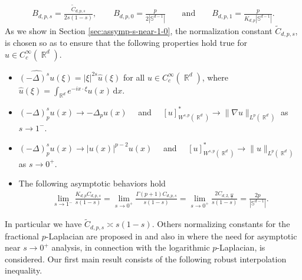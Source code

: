 \documentclass[12pt, reqno]{amsart}%
\theoremstyle{plain}  %
\theoremstyle{definition}  %
\theoremstyle{remark}
\numberwithin{equation}{section}
\DeclareMathOperator{\R}{\mathbb{R}}
\renewcommand{\d}{\,\mathrm{d}}
\begin{document}
\begin{align*}
B_{d,p,s}=  \frac{\widetilde{C}_{d,p,s}}{2s(1-s)}, \qquad B_{d,p,0}=\frac{p}{2|\mathbb{S}^{d-1}|}\qquad\text{and}\qquad B_{d,p,1}=\frac{p}{K_{d,p}|\mathbb{S}^{d-1}|}.
\end{align*}
As we  show in Section \ref{sec:assymp-s-near-1-0}, the normalization constant $\widetilde{C}_{d,p,s}$, is chosen so as to ensure that the following properties hold true for $u\in C_c^\infty(\R^d)$.
\begin{itemize}
\item $\widehat{(-\Delta)^s u}(\xi)= |\xi|^{2s}\widehat{u}(\xi)$  for all $u\in C_c^\infty(\R^d)$, where $ \widehat{u}(\xi) =\int_{\R^d} e^{-ix\cdot \xi} u(x)\d x$.
\item  $(-\Delta)^s_p u(x)\to -\Delta_p u(x)\quad$  and  $\quad[u]^*_{W^{s,p}(\R^d)}\to  \|\nabla u\|_{L^{p}(\R^d)}$ as  $s\to1^-$.
\item $(-\Delta)^s_p u(x)\to |u(x)|^{p-2} u(x)\quad$  and  $\quad[u]^*_{W^{s,p}(\R^d)}\to \|u\|_{L^{p}(\R^d)}$ as  $s\to0^+$.
\item The following asymptotic behaviors hold
\begin{align*}
\lim_{s\to 1^-} \frac{K_{d,p}C_{d,p,s}}{s(1-s)}=\lim_{s\to 0^+}\frac{\Gamma(p+1)C_{d,p,s}}{s(1-s)}=\lim_{s\to 0^+} \frac{2C_{d,2, \frac{sp}{2}}}{s(1-s)}=\frac{2p}{|\mathbb{S}^{d-1}|}.
\end{align*}
\end{itemize}
In particular we have $\widetilde{C}_{d,p,s}\asymp s(1-s)$. Others normalizing constants for the fractional $p$-Laplacian are proposed in \cite{dTGCV21} and also in \cite{DJS25} where the need for asymptotic near $s \to 0^+$ analysis, in connection with the logarithmic $p$-Laplacian, is considered.
\noindent  Our first main result consists of the following robust interpolation inequality.
\end{document}
